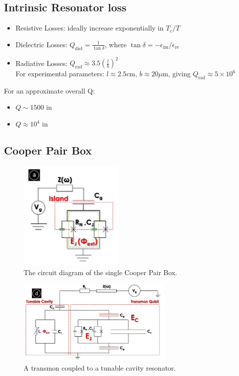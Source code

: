 \documentclass[8pt,a4paper,twocolumn]{article} %
\numberwithin{equation}{section} %
\begin{document}
		\subsection{Intrinsic Resonator loss} %
		\label{sub:intrinsic_resonator_loss}
			\begin{itemize}
				\item Resistive Losses: ideally increase exponentially in $ T_c/T $
				\item Dielectric Losses: $ Q_{\text{diel}} =\frac{1}{\tan \delta}$, where $ \tan \delta=-\epsilon_{\text{im}}/\epsilon_{\text{re}} $
				\item Radiative Losses: $Q_{\text{rad}}\approx 3.5 \left( \frac{l}{b} \right)^2$\\
				For experimental parameters: $ l\approx 2.5 $cm, $ b\approx 20 \mu $m, giving $ Q_{\text{rad}}\approx 5\times 10^6 $
			\end{itemize}
			For an approximate overall Q:
			\begin{itemize}
				\item $Q\sim 1500$ in \cite{LarsenEtal2015}
				\item $ Q\approx 10^4 $ in \cite{SchusterEtal2005}
			\end{itemize}

		\subsection{Cooper Pair Box} %
		\label{sub:cooper_pair_box}
			\begin{figure}[!h]
				\centering
				\includegraphics[width=2in]{CPB.png}
				\caption{The circuit diagram of the single Cooper Pair Box.\cite{Krantz2010} }
				\label{pic:CPB}
			\end{figure}
			\begin{figure}[!h]
				\centering
				\includegraphics[width=3in]{transmon.png}
				\caption{A transmon coupled to a tunable cavity resonator.\cite{Krantz2010} }
				\label{pic:transmon}
			\end{figure}
\end{document}
